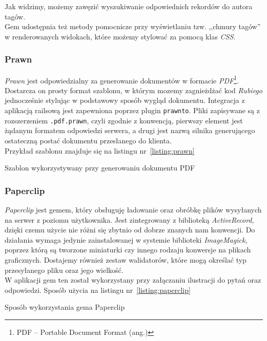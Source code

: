 \documentclass[a4paper,12pt]{article}
\begin{document}
Jak widzimy, możemy zawęzić wyszukiwanie odpowiednich rekordów do autora tagów.\\
Gem udostępnia też metody pomocnicze przy wyświetlaniu tzw. ,,chmury tagów'' w
renderowanych widokach, które możemy stylować za pomocą klas \emph{CSS}.

\subsubsection{Prawn}
\emph{Prawn} jest odpowiedzialny za generowanie dokumentów w formacie
\emph{PDF}\footnote{PDF -- Portable Document Format (ang.)}. Dostarcza on prosty format
szablonu, w którym mozemy zagnieżdżać kod \emph{Rubiego} jednocześnie stylując
w podstawowy sposób wygląd dokumentu. Integracja z aplikacją railsową jest zapewniona
poprzez plugin \texttt{prawnto}. Pliki zapisywane są z rozszerzeniem \texttt{.pdf.prawn},
czyli zgodnie z konwencją, pierwszy element jest żądanym formatem odpowiedzi serwera,
a drugi jest nazwą silnika generującego ostateczną postać dokumentu przesłanego do klienta.\\
Przykład szablonu znajduje się na listingu nr~\ref{listing:prawn}

\begin{listing}
  
  \caption{Szablon wykorzystywany przy generowaniu dokumentu PDF}
  \label{listing:prawn}
\end{listing}

\subsubsection{Paperclip}
\emph{Paperclip} jest gemem, który obsługuję ładowanie oraz obróbkę plików wysyłanych na
serwer z poziomu użytkownika. Jest zintegrowany z biblioteką \emph{ActiveRecord}, dzięki
czemu użycie nie różni się zbytnio od dobrze znanych nam konwencji. Do działania wymaga
jedynie zainstalowanej w systemie biblioteki \emph{ImageMagick}, poprzez którą są tworzone
miniaturki czy innego rodzaju konwersje na plikach graficznych. Dostajemy również zestaw
walidatorów, które mogą określać typ przesyłanego pliku oraz jego wielkość.\\
W aplikacji gem ten został wykorzystany przy załączaniu ilustracji do pytań oraz odpowiedzi.
Sposób użycia na listingu nr~\ref{listing:paperclip}

\begin{listing}
  
  \caption{Sposób wykorzystania gema Paperclip}
  \label{listing:paperclip}
\end{listing}
\end{document}
